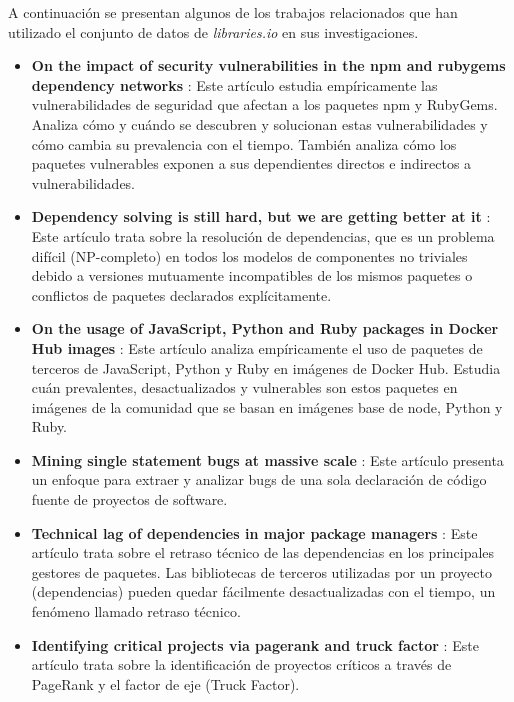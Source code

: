 A continuación se presentan algunos de los trabajos relacionados que han utilizado el conjunto de
datos de \textit{libraries.io} en sus investigaciones.
\begin{itemize}
    \item \textbf{On the impact of security vulnerabilities in the npm and rubygems dependency networks} \cite{zerouali2022impact}:
          Este artículo estudia empíricamente las vulnerabilidades de seguridad que afectan a los paquetes npm y RubyGems.
          Analiza cómo y cuándo se descubren y solucionan estas vulnerabilidades y cómo cambia su prevalencia con el tiempo.
          También analiza cómo los paquetes vulnerables exponen a sus dependientes directos e indirectos a vulnerabilidades.
    \item \textbf{Dependency solving is still hard, but we are getting better at it} \cite{abate2020dependency}:
          Este artículo trata sobre la resolución de dependencias, que es un problema difícil (NP-completo) en todos los modelos
          de componentes no triviales debido a versiones mutuamente incompatibles de los mismos paquetes o conflictos de
          paquetes declarados explícitamente.
    \item \textbf{On the usage of JavaScript, Python and Ruby packages in Docker Hub images} \cite{zerouali2021usage}:
          Este artículo analiza empíricamente el uso de paquetes de terceros de JavaScript, Python y Ruby en imágenes de Docker Hub.
          Estudia cuán prevalentes, desactualizados y vulnerables son estos paquetes en imágenes de la comunidad que se basan en
          imágenes base de node, Python y Ruby.
    \item \textbf{Mining single statement bugs at massive scale} \cite{richter2022tssb}:
          Este artículo presenta un enfoque para extraer y analizar bugs de una sola declaración de código fuente de proyectos
          de software.
    \item \textbf{Technical lag of dependencies in major package managers} \cite{stringer2020technical}:
          Este artículo trata sobre el retraso técnico de las dependencias en los principales gestores de paquetes.
          Las bibliotecas de terceros utilizadas por un proyecto (dependencias) pueden quedar fácilmente desactualizadas con el
          tiempo, un fenómeno llamado retraso técnico.
    \item \textbf{Identifying critical projects via pagerank and truck factor} \cite{pfeiffer2021identifying}:
          Este artículo trata sobre la identificación de proyectos críticos a través de PageRank y el factor de eje (Truck Factor).

\end{itemize}

